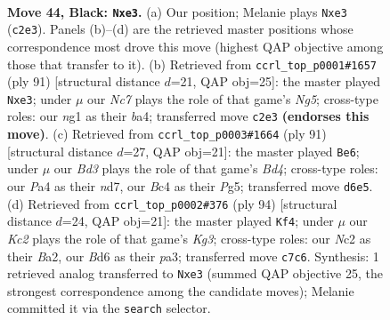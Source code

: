 \documentclass[11pt]{article}
\begin{document}
\clearpage

\begin{figure}[p]\centering
\begin{subfigure}{0.46\textwidth}\centering
\resizebox{\linewidth}{!}{%
\newchessgame
\chessboard[
  setfen={8/2k5/3b2p1/6P1/p1b5/4B3/2n2K2/6N1 b - - 23 44},
  showmover=false,
  pgfstyle=straightmove, color=movearrow, markmove={c2-e3}
]}
\caption{}
\end{subfigure}\hfill
\begin{subfigure}{0.46\textwidth}\centering
\resizebox{\linewidth}{!}{%
\newchessgame
\chessboard[
  setfen={8/8/4k3/8/B1p3n1/2P1Bb2/3K4/8 b - - 0 46},
  showmover=false,
  pgfstyle=straightmove, color=movearrow, markmove={g4-e3}
]}
\caption{}
\end{subfigure}
\\[4pt]
\begin{subfigure}{0.46\textwidth}\centering
\resizebox{\linewidth}{!}{%
\newchessgame
\chessboard[
  setfen={8/3N1k2/7p/3b2p1/3B4/4K1P1/2r1B3/8 b - - 0 46},
  showmover=false,
  pgfstyle=straightmove, color=movearrow, markmove={d5-e6}
]}
\caption{}
\end{subfigure}\hfill
\begin{subfigure}{0.46\textwidth}\centering
\resizebox{\linewidth}{!}{%
\newchessgame
\chessboard[
  setfen={1B6/8/8/6P1/2n5/p1kb2K1/B7/8 w - - 7 48},
  showmover=false,
  pgfstyle=straightmove, color=movearrow, markmove={g3-f4}
]}
\caption{}
\end{subfigure}
\caption{\textbf{Move 44, Black: \texttt{Nxe3}.} (a) Our position; Melanie plays \texttt{Nxe3} (\texttt{c2e3}). Panels (b)--(d) are the retrieved master positions whose correspondence most drove this move (highest QAP objective among those that transfer to it). (b) Retrieved from \texttt{ccrl\_top\_p0001\#1657} (ply 91) [structural distance $d$=21, QAP obj=25]: the master played \texttt{Nxe3}; under $\mu$ our \emph{Nc7} plays the role of that game's \emph{Ng5}; cross-type roles: our \emph{n}g1 as their \emph{b}a4; transferred move \texttt{c2e3} \textbf{(endorses this move)}. (c) Retrieved from \texttt{ccrl\_top\_p0003\#1664} (ply 91) [structural distance $d$=27, QAP obj=21]: the master played \texttt{Be6}; under $\mu$ our \emph{Bd3} plays the role of that game's \emph{Bd4}; cross-type roles: our \emph{P}a4 as their \emph{n}d7, our \emph{B}c4 as their \emph{P}g5; transferred move \texttt{d6e5}. (d) Retrieved from \texttt{ccrl\_top\_p0002\#376} (ply 94) [structural distance $d$=24, QAP obj=21]: the master played \texttt{Kf4}; under $\mu$ our \emph{Kc2} plays the role of that game's \emph{Kg3}; cross-type roles: our \emph{N}c2 as their \emph{B}a2, our \emph{B}d6 as their \emph{p}a3; transferred move \texttt{c7c6}. Synthesis: 1 retrieved analog transferred to \texttt{Nxe3} (summed QAP objective 25, the strongest correspondence among the candidate moves); Melanie committed it via the \texttt{search} selector.}
\label{fig:thought-m87}
\end{figure}
\end{document}
